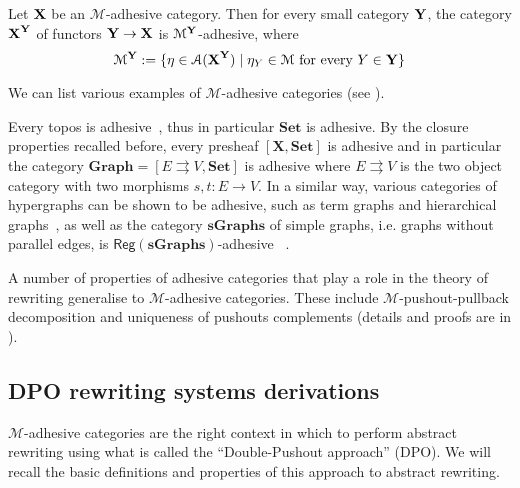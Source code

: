 \documentclass[a4paper,UKenglish,cleveref,pdftex,thm-restate,numberwithinsect,anonymous]{lipics}
\newcommand{\reg}{\mathsf{Reg}}
\newcommand{\cat}[1]{\ensuremath{\mathbf{#1}}}
\def\X{\textbf {\textup{X}}}
\def\Y{\textbf {\textup{Y}}}
\begin{document}
\begin{theorem}
  \label{thm:functors}
  Let $\X$ be an $\mathcal{M}$-adhesive category. Then for every small
  category $\Y$, the category $\X^\Y$ of functors $\Y\to \X$ is
  $\mathcal{M}^{\Y}$-adhesive, where
  \[\mathcal{M}^{\Y}:=\{\eta \in \mathcal{A}(\X^\Y) \mid \eta_Y \in
    \mathcal{M} \text{ for every } Y\in \Y\}\]
\end{theorem}

We can list various examples of $\mathcal{M}$-adhesive categories (see
\cite{castelnovo2023thesis,CastelnovoGM22,lack2006toposes}).


\begin{example}
  \label{ex:adhesive}
  Every topos is adhesive~\cite{lack2006toposes}, thus in particular
  $\cat{Set}$ is adhesive. By the closure properties recalled before,
  every presheaf $[\cat{X},\cat{Set}]$ is adhesive and in particular
  the category $\cat{Graph} = [ E \rightrightarrows V, \cat{Set}]$ is
  adhesive where $E \rightrightarrows {V}$ is the two object category
  with two morphisms $s,t \colon{E} \to {V}$. In a similar way,
  various categories of hypergraphs can be shown to be adhesive, 
  such as term graphs and hierarchical graphs~\cite{CastelnovoGM24},
  as well as the category $\cat{sGraphs}$ of simple graphs, i.e. graphs without
  parallel edges, is $\reg{(\cat{sGraphs})}$-adhesive~\cite{xxx}
.%
\end{example}


A number of properties of adhesive categories that play a role in the
theory of rewriting generalise to $\mathcal{M}$-adhesive
categories. These include $\mathcal{M}$-pushout-pullback decomposition
and uniqueness of pushouts complements (details and proofs are in
).

\subsection{DPO rewriting systems derivations}\label{subsec:DPO}

$\mathcal{M}$-adhesive categories are the right context in which to
perform abstract rewriting using what is called the ``Double-Pushout
approach'' (DPO). We will recall the basic definitions and properties
of this approach to abstract rewriting.
\end{document}

